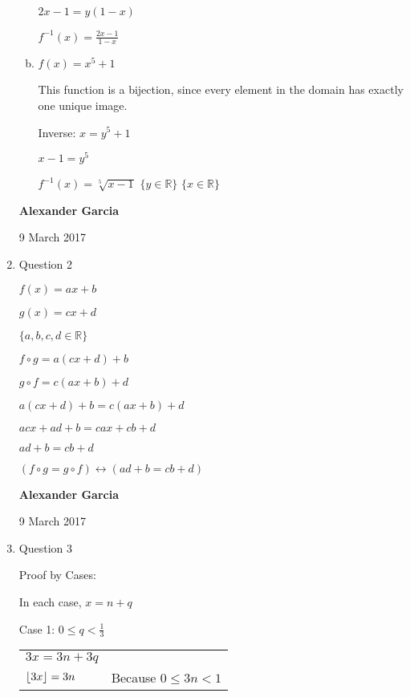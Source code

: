 \documentclass[11pt]{article}
\DeclarePairedDelimiter\floor{\lfloor}{\rfloor}
\begin{document}
\begin{enumerate}
\begin{enumerate}[(a)]
				$2x - 1 = y(1 - x)$

				$f^{-1}(x) = \frac{2x-1}{1-x}$ \\

			\item $f(x) = x^5 + 1$

				This function is a bijection, since every element in the domain has exactly one unique
				image.

				Inverse: $x = y^5 + 1$

				$x-1 = y^5$

				$f^{-1}(x) = \sqrt[5]{x-1}$
				$\{y \in \mathbb{R}\}$
				$\{x \in \mathbb{R}\}$


		\end{enumerate}

	\textbf{Alexander Garcia}

	9 March 2017 \\

	\item Question 2

		$f(x) = ax + b$

		$g(x) = cx + d$

		$\{a, b, c, d \in \mathbb{R}\}$

		$f \circ g = a(cx + d) + b$

		$g \circ f = c(ax + b) + d$

		$a(cx + d) + b = c(ax + b) + d$

		$acx + ad + b = cax + cb + d$

		$ad + b = cb + d$

		$(f \circ g = g \circ f) \leftrightarrow
		(ad + b = cb + d)$ \\


		\newpage

		\textbf{Alexander Garcia}

		9 March 2017 \\

	\item Question 3

		Proof by Cases:

		In each case, $x = n + q$

		Case 1: $0 \leq q < \frac{1}{3}$

		\begin{tabular}{ll}
			$3x = 3n + 3q$ \\

			$\floor*{3x} = 3n$ &
			Because $0 \leq 3n < 1$ \\


\end{tabular}
\end{enumerate}
\end{document}
